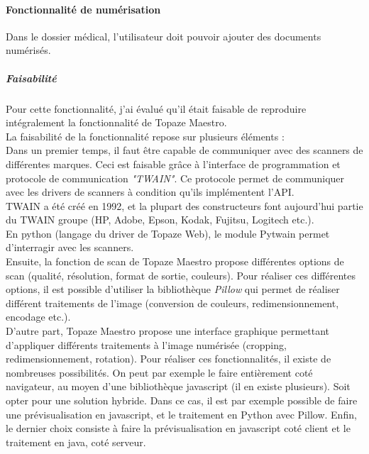 \paragraph*{Fonctionnalité de numérisation\\}
Dans le dossier médical, l'utilisateur doit pouvoir ajouter des documents numérisés.

\subparagraph*{Faisabilité}
Pour cette fonctionnalité, j'ai évalué qu'il était faisable de reproduire intégralement la fonctionnalité de Topaze Maestro.\\

La faisabilité de la fonctionnalité repose sur plusieurs éléments :\\
Dans un premier temps, il faut être capable de communiquer avec des scanners de différentes marques. Ceci est faisable grâce à l'interface de programmation et protocole de communication \textit{"TWAIN"}. Ce protocole permet de communiquer avec les drivers de  scanners à condition qu'ils implémentent l'API.\\
TWAIN a été créé en 1992\cite{bib:twain}, et la plupart des constructeurs font aujourd'hui partie du TWAIN groupe (HP, Adobe, Epson, Kodak, Fujitsu, Logitech etc.).\\
En python (langage du driver de Topaze Web), le module Pytwain permet d'interragir avec les scanners.\\

Ensuite, la fonction de scan de Topaze Maestro propose différentes options de scan (qualité, résolution, format de sortie, couleurs). Pour réaliser ces différentes options, il est possible d'utiliser la bibliothèque \textit{Pillow} qui permet de réaliser différent traitements de l'image (conversion de couleurs, redimensionnement, encodage etc.)\cite{bib:pillow}.\\

D'autre part, Topaze Maestro propose une interface graphique permettant d'appliquer différents traitements à l'image numérisée (cropping, redimensionnement, rotation). 
Pour réaliser ces fonctionnalités, il existe de nombreuses possibilités. On peut par exemple le faire entièrement coté navigateur, au moyen d'une bibliothèque javascript (il en existe plusieurs). Soit opter pour une solution hybride. Dans ce cas, il est par exemple possible de faire une prévisualisation en javascript, et le traitement en Python avec Pillow. 
Enfin, le dernier choix consiste à faire la prévisualisation en javascript coté client et le traitement en java, coté serveur. \\

